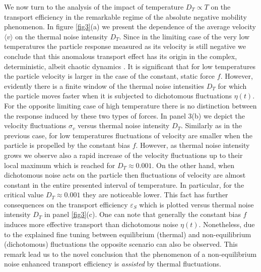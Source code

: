 \documentclass[12pt]{iopart}
\begin{document}
We now turn to the analysis of the impact of  temperature $D_T \propto T$ on the transport efficiency in the remarkable regime of the absolute negative mobility phenomenon. In figure \ref{fig3}(a) we present the dependence of the 
average velocity $\langle v \rangle$ on the thermal noise intensity $D_T$. Since in the limiting case of the very low temperatures the particle response measured as its velocity is still negative we conclude that this anomalous transport effect has its origin in the complex, deterministic, albeit 
chaotic dynamics \cite{MacKos2007,speer2007}. It is significant that for  low temperatures the particle velocity is larger in the case of the constant, static force $f$. However, evidently there is a finite window of the thermal noise intensities $D_T$ for which the particle moves faster when it is subjected 
to dichotomous fluctuations $\eta(t)$. For the opposite limiting case of high temperature there is no distinction between the response induced by these two types of forces. In panel 3(b) we depict the velocity fluctuations $\sigma_v$ 
versus thermal noise intensity $D_T$. Similarly as in the previous case, for low temperatures fluctuations of velocity are smaller when the particle is propelled by the constant bias $f$. However, as thermal noise intensity grows we observe also a rapid increase of the velocity fluctuations up to 
their local maximum which is reached for $D_T \approx 0.001$. On the other hand, when dichotomous noise acts on the particle then  fluctuations of velocity are almost constant in the entire presented interval of temperature. In particular, for the critical value $D_T \approx 0.001$ they are noticeable lower. This fact has further consequences on the transport efficiency $\varepsilon_S$ which is plotted versus thermal noise intensity $D_T$ in panel \ref{fig3}(c). One can note that generally the constant bias $f$ induces more effective transport than dichotomous noise $\eta(t)$. Nonetheless, due to the explained fine tuning between equilibrium (thermal) and non-equilibrium (dichotomous) fluctuations the opposite scenario can also be observed. This remark lead us to the novel conclusion that the phenomenon of a non-equilibrium 
noise enhanced transport efficiency is \emph{assisted} by thermal fluctuations.
\end{document}
